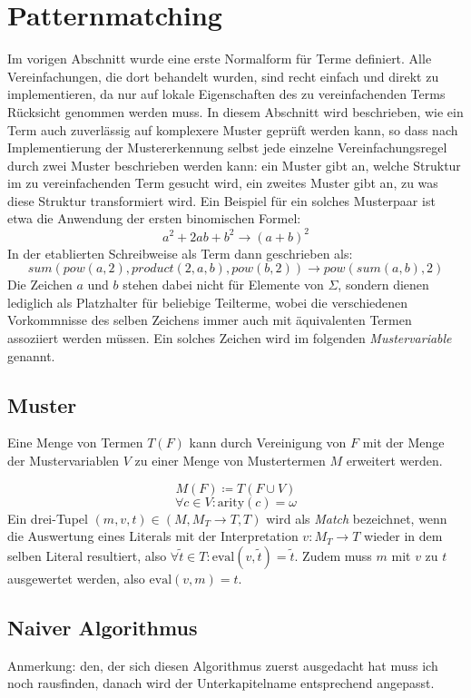 \documentclass{article}
\begin{document}
\section{Patternmatching}
Im vorigen Abschnitt wurde eine erste Normalform für Terme definiert. Alle Vereinfachungen, die dort behandelt wurden, sind recht einfach und direkt zu implementieren, da nur auf lokale Eigenschaften des zu vereinfachenden Terms Rücksicht genommen werden muss. In diesem Abschnitt wird beschrieben, wie ein Term auch zuverlässig auf komplexere Muster geprüft werden kann, so dass nach Implementierung der Mustererkennung selbst jede einzelne Vereinfachungsregel durch zwei Muster beschrieben werden kann: ein Muster gibt an, welche Struktur im zu vereinfachenden Term gesucht wird, ein zweites Muster gibt an, zu was diese Struktur transformiert wird. Ein Beispiel für ein solches Musterpaar ist etwa die Anwendung der ersten binomischen Formel:
$$a^2 + 2 a b + b^2 \rightarrow (a + b)^2$$
In der etablierten Schreibweise als Term dann geschrieben als:
$$sum(pow(a, 2), product(2, a, b), pow(b, 2)) \rightarrow pow(sum(a, b), 2)$$
Die Zeichen $a$ und $b$ stehen dabei nicht für Elemente von $\Sigma$, sondern dienen lediglich als Platzhalter für beliebige Teilterme, wobei die verschiedenen Vorkommnisse des selben Zeichens immer auch mit äquivalenten Termen assoziiert werden müssen. Ein solches Zeichen wird im folgenden \textit{Mustervariable} genannt.

\subsection{Muster}
Eine Menge von Termen $T(F)$ kann durch Vereinigung von $F$ mit der Menge der Mustervariablen $V$ zu einer Menge von Mustertermen $M$ erweitert werden. 

$$M(F) \coloneqq T(F \cup V)$$
$$\forall c\in V \colon \mathrm{arity}(c) = \omega$$
Ein drei-Tupel $(m, v, t) \in (M, M_T \rightarrow T, T)$ wird als \textit{Match} bezeichnet, wenn die Auswertung eines Literals mit der Interpretation $v \colon M_T \rightarrow T$ wieder in dem selben Literal resultiert, also $ \forall \tilde{t} \in T \colon \mathrm{eval}(v, \tilde{t}) =\tilde{t}$. Zudem muss $m$ mit $v$ zu $t$ ausgewertet werden, also $\mathrm{eval}(v, m) = t$.

\subsection{Naiver Algorithmus}
\begin{itshape}
Anmerkung: den, der sich diesen Algorithmus zuerst ausgedacht hat muss ich noch rausfinden, danach wird der Unterkapitelname entsprechend angepasst.
\end{itshape}
\end{document}
